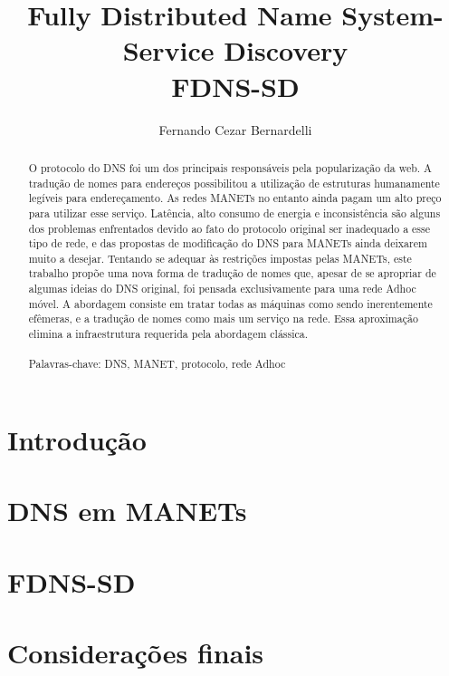 \documentclass[12pt,a4paper]{style/ufpr}
\title{Fully Distributed Name System-Service Discovery\\FDNS-SD}
\author{Fernando Cezar Bernardelli}
\date{}
\begin{document}
\makecapaproposta
\makecapaproposta

\begin{abstract}
    O protocolo do DNS foi um dos principais responsáveis pela popularização da
    web. A tradução de nomes para endereços possibilitou a utilização de estruturas
    humanamente legíveis para endereçamento. As redes MANETs no entanto ainda pagam
    um alto preço para utilizar esse serviço. Latência, alto consumo de energia e
    inconsistência são alguns dos problemas enfrentados devido ao fato do
    protocolo original ser inadequado a esse tipo de rede, e das propostas de modificação
    do DNS para MANETs ainda deixarem muito a desejar. Tentando se adequar às
    restrições impostas pelas MANETs, este trabalho propõe uma nova forma de
    tradução de nomes que, apesar de se apropriar de algumas ideias do DNS
    original, foi pensada exclusivamente para uma rede Adhoc móvel. A abordagem
    consiste em tratar todas as máquinas como sendo inerentemente efêmeras, e a
    tradução de nomes como mais um serviço na rede. Essa aproximação elimina a
    infraestrutura requerida pela abordagem clássica.
    \\
    \\
    Palavras-chave: DNS, MANET, protocolo, rede Adhoc
\end{abstract}

\tableofcontents
\listoffigures
\newpage

\chapter{Introdução}


\chapter{DNS em MANETs}


\chapter{FDNS-SD}


\chapter{Considerações finais}


\newpage


\end{document}
